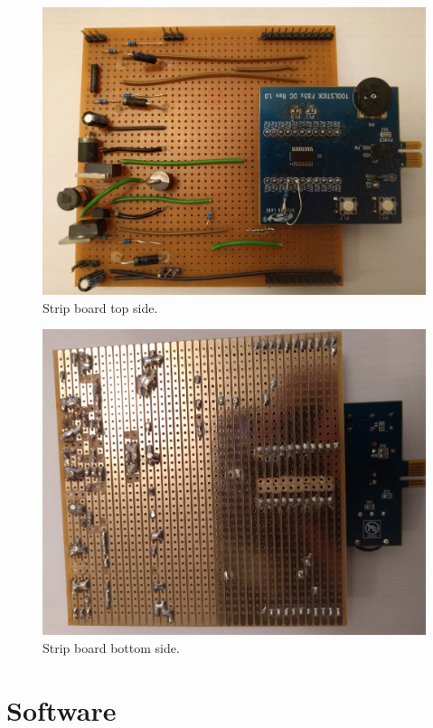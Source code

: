 \documentclass[12pt]{article}%
\begin{document}
\begin{figure}[H]
	\centering
  	\includegraphics[width=16cm]{top.jpg}
  	\caption{Strip board top side.}
  	\label{fig:top}
\end{figure}

\begin{figure}[H]
	\centering
  	\includegraphics[width=16cm]{bot.jpg}
  	\caption{Strip board bottom side.}
  	\label{fig:bot}
\end{figure}

\section{Software}
\end{document}
